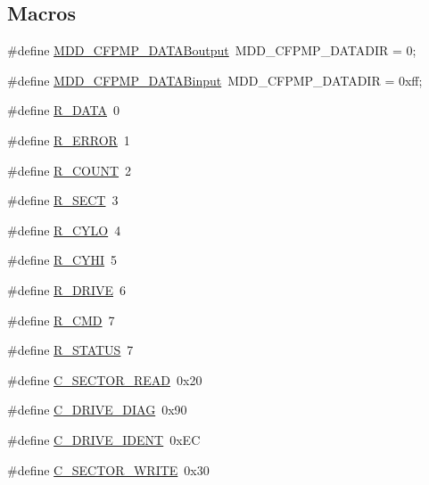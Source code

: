 \subsection*{Macros}
\begin{DoxyCompactItemize}
\item 
\#define \hyperlink{_c_f-_p_m_p_8h_a01e988e1c07e239b6c9d0dd2f128141c}{M\+D\+D\+\_\+\+C\+F\+P\+M\+P\+\_\+\+D\+A\+T\+A\+Boutput}~M\+D\+D\+\_\+\+C\+F\+P\+M\+P\+\_\+\+D\+A\+T\+A\+D\+I\+R = 0;
\item 
\#define \hyperlink{_c_f-_p_m_p_8h_a12ec93c6367f94fb57e27273173baaf8}{M\+D\+D\+\_\+\+C\+F\+P\+M\+P\+\_\+\+D\+A\+T\+A\+Binput}~M\+D\+D\+\_\+\+C\+F\+P\+M\+P\+\_\+\+D\+A\+T\+A\+D\+I\+R = 0xff;
\item 
\#define \hyperlink{_c_f-_p_m_p_8h_ac51dc180dde0fcda153d9e61f5c0f2f8}{R\+\_\+\+D\+A\+T\+A}~0
\item 
\#define \hyperlink{_c_f-_p_m_p_8h_ae49fbda11f529ae6d8a581b6e0fd1a75}{R\+\_\+\+E\+R\+R\+O\+R}~1
\item 
\#define \hyperlink{_c_f-_p_m_p_8h_a0cb64f6ffafe32f3ef2b7a7b1051b591}{R\+\_\+\+C\+O\+U\+N\+T}~2
\item 
\#define \hyperlink{_c_f-_p_m_p_8h_a2d8f9df446db95fd0706bf4ec03414c7}{R\+\_\+\+S\+E\+C\+T}~3
\item 
\#define \hyperlink{_c_f-_p_m_p_8h_a970d3f9d433a03b1978c39ff42b70fa2}{R\+\_\+\+C\+Y\+L\+O}~4
\item 
\#define \hyperlink{_c_f-_p_m_p_8h_ab81360234f216f08abe4f84bc2cd15bd}{R\+\_\+\+C\+Y\+H\+I}~5
\item 
\#define \hyperlink{_c_f-_p_m_p_8h_a1b75a52bc066351024467526af17a4e0}{R\+\_\+\+D\+R\+I\+V\+E}~6
\item 
\#define \hyperlink{_c_f-_p_m_p_8h_acc6fa55e6ee7e4b6adc5fdc8928b5dd9}{R\+\_\+\+C\+M\+D}~7
\item 
\#define \hyperlink{_c_f-_p_m_p_8h_aef698ae444239bc08e1975c5dfd9dbe0}{R\+\_\+\+S\+T\+A\+T\+U\+S}~7
\item 
\#define \hyperlink{_c_f-_p_m_p_8h_abe7e650a18acb80c9691f309da6dd95b}{C\+\_\+\+S\+E\+C\+T\+O\+R\+\_\+\+R\+E\+A\+D}~0x20
\item 
\#define \hyperlink{_c_f-_p_m_p_8h_a97dcd644c5d9c9767c6c63c3d16842a2}{C\+\_\+\+D\+R\+I\+V\+E\+\_\+\+D\+I\+A\+G}~0x90
\item 
\#define \hyperlink{_c_f-_p_m_p_8h_a89ddf92d78e74d55f0a44e0ce8df18f3}{C\+\_\+\+D\+R\+I\+V\+E\+\_\+\+I\+D\+E\+N\+T}~0x\+E\+C
\item 
\#define \hyperlink{_c_f-_p_m_p_8h_a42e5ada449a09584e6d5a3927624a20d}{C\+\_\+\+S\+E\+C\+T\+O\+R\+\_\+\+W\+R\+I\+T\+E}~0x30

\end{DoxyCompactItemize}
